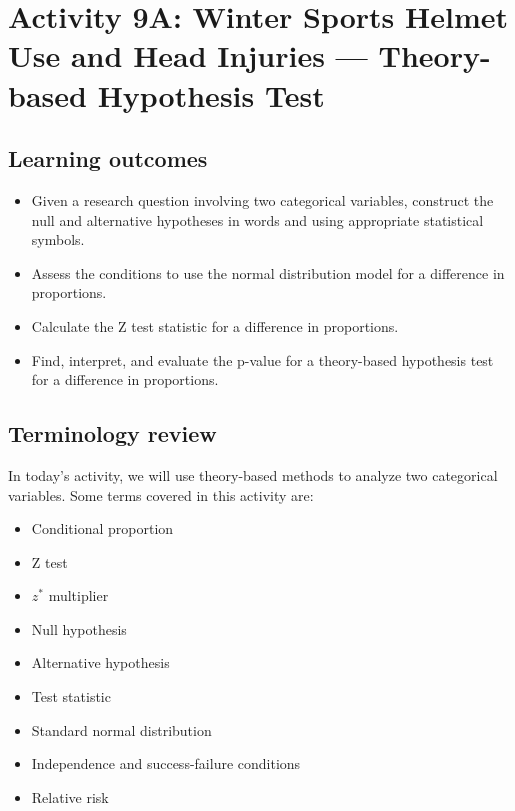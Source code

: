 \documentclass[
]{report}
\begin{document}
\newpage

\hypertarget{activity-9a-winter-sports-helmet-use-and-head-injuries-theory-based-hypothesis-test}{%
\section{Activity 9A: Winter Sports Helmet Use and Head Injuries --- Theory-based Hypothesis Test}\label{activity-9a-winter-sports-helmet-use-and-head-injuries-theory-based-hypothesis-test}}


\hypertarget{learning-outcomes-17}{%
\subsection{Learning outcomes}\label{learning-outcomes-17}}

\begin{itemize}
\item
  Given a research question involving two categorical variables, construct the null and alternative hypotheses
  in words and using appropriate statistical symbols.
\item
  Assess the conditions to use the normal distribution model for a difference in proportions.
\item
  Calculate the Z test statistic for a difference in proportions.
\item
  Find, interpret, and evaluate the p-value for a theory-based hypothesis test for a difference in proportions.
\end{itemize}

\hypertarget{terminology-review-15}{%
\subsection{Terminology review}\label{terminology-review-15}}

In today's activity, we will use theory-based methods to analyze two categorical variables. Some terms covered in this activity are:

\begin{itemize}
\item
  Conditional proportion
\item
  Z test
\item
  \(z^*\) multiplier
\item
  Null hypothesis
\item
  Alternative hypothesis
\item
  Test statistic
\item
  Standard normal distribution
\item
  Independence and success-failure conditions
\item
  Relative risk
\end{itemize}
\end{document}
